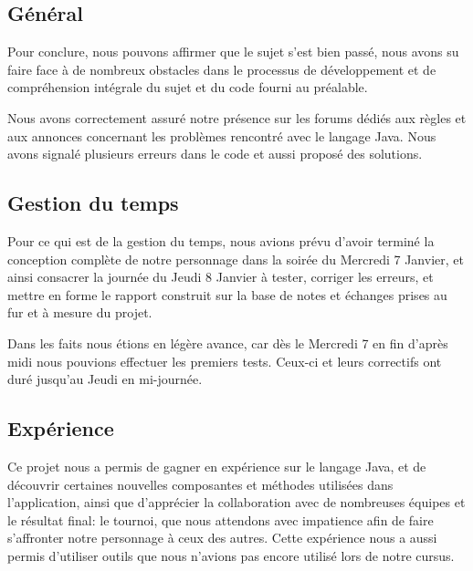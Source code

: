 \documentclass{article}
\begin{document}
\subsection*{Général}
Pour conclure, nous pouvons affirmer que le sujet s'est bien passé, nous avons su faire face à de nombreux obstacles dans le processus de développement et de compréhension intégrale du sujet et du code fourni au préalable. 

Nous avons correctement assuré notre présence sur les forums dédiés aux règles et aux annonces concernant les problèmes rencontré avec le langage Java. Nous avons signalé plusieurs erreurs dans le code et aussi proposé des solutions.

\subsection*{Gestion du temps}
Pour ce qui est de la gestion du temps, nous avions prévu d'avoir terminé la conception complète de notre personnage dans la soirée du Mercredi 7 Janvier, et ainsi consacrer la journée du Jeudi 8 Janvier à tester, corriger les erreurs, et mettre en forme le rapport construit sur la base de notes et échanges prises au fur et à mesure du projet.

Dans les faits nous étions en légère avance, car dès le Mercredi 7 en fin d'après midi nous pouvions effectuer les premiers tests. Ceux-ci et leurs correctifs ont duré jusqu'au Jeudi en mi-journée.

\subsection*{Expérience}
Ce projet nous a permis de gagner en expérience sur le langage Java, et de découvrir certaines nouvelles composantes et méthodes utilisées
dans l'application, ainsi que d'apprécier la collaboration avec de nombreuses équipes et le résultat final: le tournoi, que nous attendons avec impatience afin de faire s'affronter notre personnage à ceux des autres.
Cette expérience nous a aussi permis d'utiliser outils que nous n'avions pas encore utilisé lors de notre cursus.

\clearpage
\tableofcontents
\end{document}
